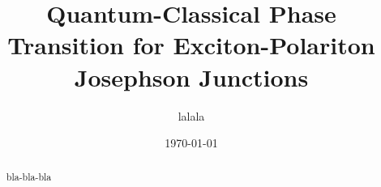 \documentclass[aps,prl,preprint,groupedaddress]{revtex4-1}
\begin{document}

\title{Quantum-Classical Phase Transition for Exciton-Polariton Josephson Junctions}


\author{lalala}
\affiliation{}


\date{\today}

\begin{abstract}
bla-bla-bla
\end{abstract}

\pacs{}

\maketitle

\newcommand{\sn}{\textrm{sn}}
\newcommand{\cn}{\textrm{cn}}
\newcommand{\dn}{\textrm{dn}}
\newcommand{\sd}{\textrm{sd}}
\newcommand{\cd}{\textrm{cd}}
\newcommand{\nd}{\textrm{nd}}
\newcommand{\am}{\textrm{am}}
\end{document}
